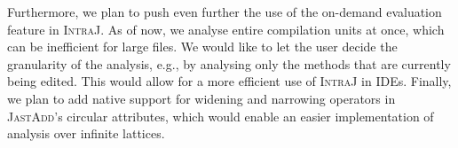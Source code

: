 Furthermore, we plan to push even further the use of the on-demand evaluation
feature in \textsc{IntraJ}. As of now, we analyse entire compilation units at once,
which can be inefficient for large files. We would like to let the user decide the 
granularity of the analysis, e.g., by analysing only the methods that are currently
being edited. This would allow for a more efficient use of \textsc{IntraJ} in IDEs.
Finally, we plan to add native support for widening and narrowing
operators in \textsc{JastAdd}'s circular attributes, which would enable an easier implementation
of analysis over infinite lattices.
